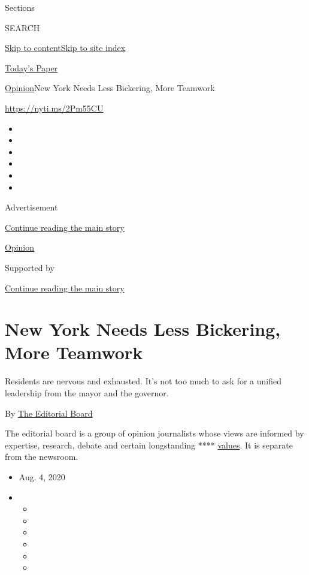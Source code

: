 Sections

SEARCH

\protect\hyperlink{site-content}{Skip to
content}\protect\hyperlink{site-index}{Skip to site index}

\href{https://myaccount.nytimes.com/auth/login?response_type=cookie\&client_id=vi}{}

\href{https://www.nytimes.com/section/todayspaper}{Today's Paper}

\href{/section/opinion}{Opinion}\textbar{}New York Needs Less Bickering,
More Teamwork

\url{https://nyti.ms/2Pm55CU}

\begin{itemize}
\item
\item
\item
\item
\item
\item
\end{itemize}

Advertisement

\protect\hyperlink{after-top}{Continue reading the main story}

\href{/section/opinion}{Opinion}

Supported by

\protect\hyperlink{after-sponsor}{Continue reading the main story}

\hypertarget{new-york-needs-less-bickering-more-teamwork}{%
\section{New York Needs Less Bickering, More
Teamwork}\label{new-york-needs-less-bickering-more-teamwork}}

Residents are nervous and exhausted. It's not too much to ask for a
unified leadership from the mayor and the governor.

By
\href{https://www.nytimes.com/interactive/opinion/editorialboard.html}{The
Editorial Board}

The editorial board is a group of opinion journalists whose views are
informed by expertise, research, debate and certain longstanding ****
\href{https://www.nytimes.com/interactive/2018/opinion/editorialboard.html}{values}.
It is separate from the newsroom.

\begin{itemize}
\item
  Aug. 4, 2020
\item
  \begin{itemize}
  \item
  \item
  \item
  \item
  \item
  \item
  \end{itemize}
\end{itemize}

